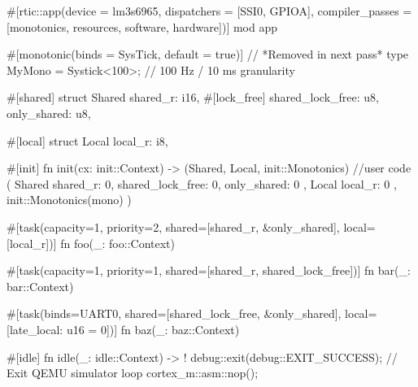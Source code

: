 #[rtic::app(device = lm3s6965, dispatchers = [SSI0, GPIOA], 
    compiler_passes = [monotonics, resources, software, hardware])]
mod app {
    #[monotonic(binds = SysTick, default = true)] // *Removed in next pass*
    type MyMono = Systick<100>; // 100 Hz / 10 ms granularity

    #[shared]
    struct Shared {
        shared_r: i16,
        #[lock_free]
        shared_lock_free: u8,
        only_shared: u8,
    }

    #[local]
    struct Local {
        local_r: i8,
    }

    #[init]
    fn init(cx: init::Context) -> (Shared, Local, init::Monotonics) {
        //user code
        (
            Shared { shared_r: 0, shared_lock_free: 0, only_shared: 0 }, 
            Local { local_r: 0 }, 
            init::Monotonics(mono)
        )
    }

    #[task(capacity=1, priority=2, shared=[shared_r, &only_shared], local=[local_r])]
    fn foo(_: foo::Context) {
    }

    #[task(capacity=1, priority=1, shared=[shared_r, shared_lock_free])]
    fn bar(_: bar::Context) {
    }

    #[task(binds=UART0, shared=[shared_lock_free, &only_shared], local=[late_local: u16 = 0])]
    fn baz(_: baz::Context){
    }

    #[idle]
    fn idle(_: idle::Context) -> ! {
        debug::exit(debug::EXIT_SUCCESS); // Exit QEMU simulator
        loop {
            cortex_m::asm::nop();
        }
    }
}
